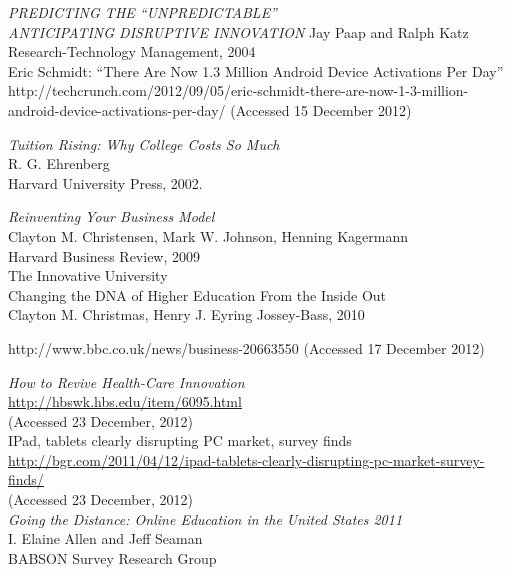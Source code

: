 \documentclass[a4paper,10pt]{book}
\begin{document}
\begin{thebibliography}{9}
  \emph{PREDICTING THE “UNPREDICTABLE”\\
  ANTICIPATING DISRUPTIVE INNOVATION}
  Jay Paap and Ralph Katz\\
  Research-Technology Management, 2004\\ 


  Eric Schmidt: “There Are Now 1.3 Million Android Device Activations Per Day”
   http://techcrunch.com/2012/09/05/eric-schmidt-there-are-now-1-3-million-android-device-activations-per-day/
   (Accessed 15 December 2012)

 \emph{Tuition Rising: Why College Costs So Much} \\ 
 R. G. Ehrenberg\\
 Harvard University Press, 2002.
 
  \emph{Reinventing Your Business Model} \\
  Clayton M. Christensen, Mark W. Johnson, Henning Kagermann\\
  Harvard Business Review, 2009\\
 
 The Innovative University \\
 Changing the DNA of Higher Education From the Inside Out \\
 Clayton M. Christmas, Henry J. Eyring
 Jossey-Bass, 2010
 
 http://www.bbc.co.uk/news/business-20663550
 (Accessed 17 December 2012)

  \emph{How to Revive Health-Care Innovation}\\
  \url{http://hbswk.hbs.edu/item/6095.html}\\
  (Accessed 23 December, 2012)\\
 

IPad, tablets clearly disrupting PC market, survey finds\\
\url{http://bgr.com/2011/04/12/ipad-tablets-clearly-disrupting-pc-market-survey-finds/}\\
  (Accessed 23 December, 2012)\\
 
  \emph{Going the Distance: Online Education in the United States 2011}\\
  I. Elaine Allen and Jeff Seaman\\
  BABSON Survey Research Group\\


\end{thebibliography}
\end{document}
